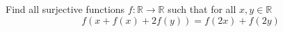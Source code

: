 Find all surjective functions $f\colon\mathbb{R} \rightarrow \mathbb{R}$ such that
for all $x,y \in \mathbb{R}$
$$f(x+f(x)+2f(y)) = f(2x) + f(2y)$$
